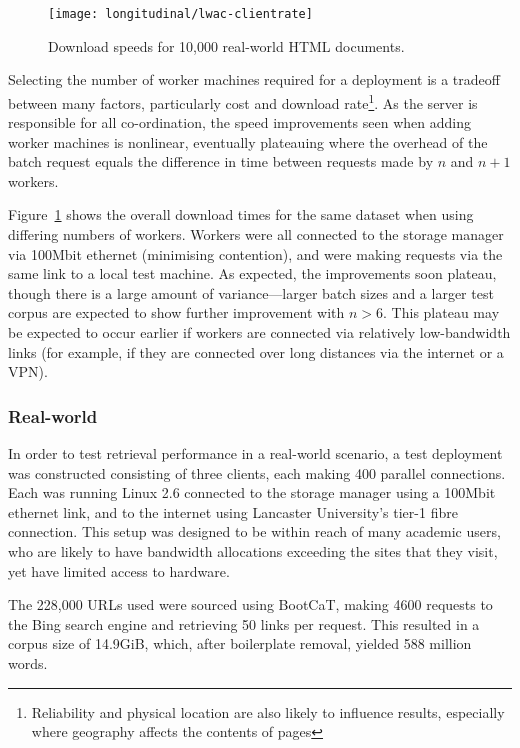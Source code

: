 \begin{figure}[Ht]
    \centering
    \texttt{[image: longitudinal/lwac-clientrate]}
    \caption{Download speeds for 10,000 real-world HTML documents.}
    \label{fig:longitudinal:lwac:numclients}
\end{figure}


Selecting the number of worker machines required for a deployment is a tradeoff between many factors, particularly cost and download rate\footnote{Reliability and physical location are also likely to influence results, especially where geography affects the contents of pages}.  As the server is responsible for all co-ordination, the speed improvements seen when adding worker machines is nonlinear, eventually plateauing where the overhead of the batch request equals the difference in time between requests made by $n$ and $n + 1$ workers.

Figure~\ref{fig:longitudinal:lwac:numclients} shows the overall download times for the same dataset when using differing numbers of workers.  Workers were all connected to the storage manager via 100Mbit ethernet (minimising contention), and were making requests via the same link to a local test machine.  As expected, the improvements soon plateau, though there is a large amount of variance---larger batch sizes and a larger test corpus are expected to show further improvement with $n > 6$.  This plateau may be expected to occur earlier if workers are connected via relatively low-bandwidth links (for example, if they are connected over long distances via the internet or a VPN).





\subsubsection{Real-world}

In order to test retrieval performance in a real-world scenario, a test deployment was constructed consisting of three clients, each making 400 parallel connections.  Each was running Linux 2.6 connected to the storage manager using a 100Mbit ethernet link, and to the internet using Lancaster University's tier-1 fibre connection.  This setup was designed to be within reach of many academic users, who are likely to have bandwidth allocations exceeding the sites that they visit, yet have limited access to hardware.


The 228,000 URLs used were sourced using BootCaT, making 4600 requests to the Bing search engine and retrieving 50 links per request.  This resulted in a corpus size of 14.9GiB, which, after boilerplate removal, yielded 588 million words.


